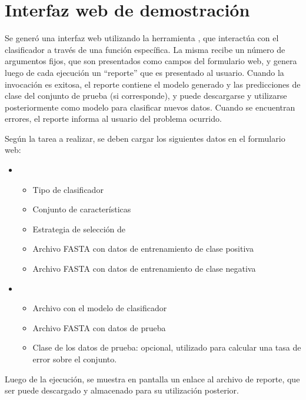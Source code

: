 %
%
\section{Interfaz web de demostración}
%
Se generó una interfaz web utilizando la herramienta \eng{\webdemo{}}
\cite{webdemobuilder}, que interactúa con el clasificador a través de
una función específica.
La misma recibe un número de argumentos fijos, que son presentados
como campos del formulario web, y genera luego de cada ejecución un
``reporte'' que es presentado al usuario.
Cuando la invocación es exitosa, el reporte contiene el modelo
generado y las predicciones de clase del conjunto de prueba (si
corresponde), y puede descargarse y utilizarse posteriormente como
modelo para clasificar nuevos datos.
Cuando se encuentran errores, el reporte informa al usuario del
problema ocurrido.

Según la tarea a realizar, se deben cargar los siguientes datos en el
formulario web:
%
\begin{itemize}
\item
  \begin{itemize}
  \item
    Tipo de clasificador
  \item
    Conjunto de características
  \item
    Estrategia de selección de 
  \item
    Archivo FASTA con datos de entrenamiento de clase positiva
  \item
    Archivo FASTA con datos de entrenamiento de clase negativa
  \end{itemize}
\item
  \begin{itemize}
  \item
    Archivo con el modelo de clasificador
  \item
    Archivo FASTA con datos de prueba
  \item
    Clase de los datos de prueba: opcional, utilizado para calcular
    una tasa de error sobre el conjunto.
  \end{itemize}
\end{itemize}
%
Luego de la ejecución, se muestra en pantalla un enlace al archivo de
reporte, que ser puede descargado y almacenado para su utilización
posterior.
